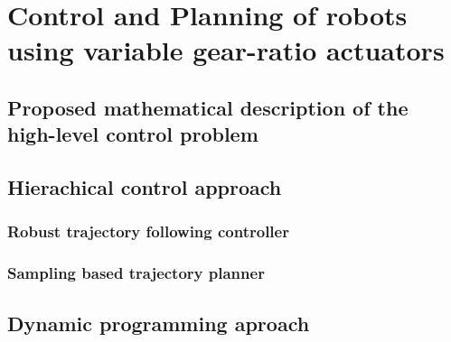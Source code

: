 \chapter{Control and Planning of robots using variable gear-ratio actuators}
\label{sec:ControlAndPlanningOfRobotUsingVariableGearRatioActuators}


\section{Proposed mathematical description of the high-level control problem}
\label{sec:ProposedMathematicalDescriptionOfTheHighLevelControlProblem}


\section{Hierachical control approach}
\label{sec:HierachicalControlApproach}

\subsection{Robust trajectory following controller}
\label{sec:RobustTrajectoryFollowingController}


\subsection{Sampling based trajectory planner}
\label{sec:SamplingBasedTrajectoryPlanner}


\section{Dynamic programming aproach}
\label{sec:DynamicProgrammingAproach}

